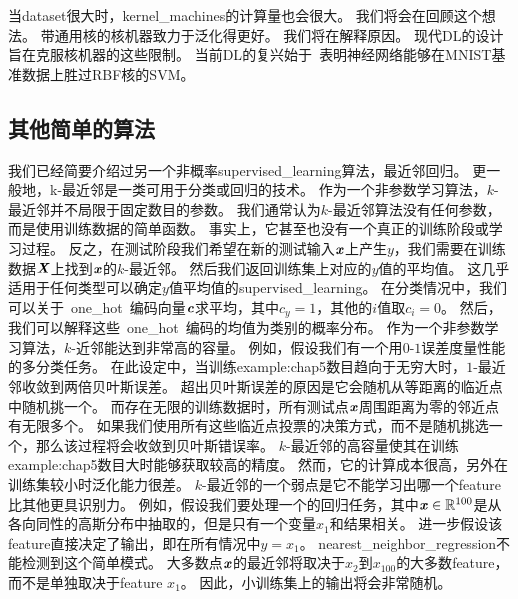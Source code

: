 当\gls{dataset}很大时，\gls{kernel_machines}的计算量也会很大。
我们将会在回顾这个想法。
带通用核的核机器致力于泛化得更好。
我们将在解释原因。
现代\gls{DL}的设计旨在克服核机器的这些限制。
当前\gls{DL}的复兴始于~\cite{Hinton06-small}表明神经网络能够在MNIST基准数据上胜过RBF核的\gls{SVM}。


\subsection{其他简单的算法}
\label{sec:other_simple_supervised_learning_algorithms}
我们已经简要介绍过另一个非概率\gls{supervised_learning}算法，最近邻回归。
更一般地，k-最近邻是一类可用于分类或回归的技术。
作为一个非参数学习算法，$k$-最近邻并不局限于固定数目的参数。
我们通常认为$k$-最近邻算法没有任何参数，而是使用训练数据的简单函数。
事实上，它甚至也没有一个真正的训练阶段或学习过程。
反之，在测试阶段我们希望在新的测试输入$\boldsymbol{\mathit{x}}$上产生$y$，我们需要在训练数据$\boldsymbol{\mathit{X}}$上找到$\boldsymbol{\mathit{x}}$的$k$-最近邻。
然后我们返回训练集上对应的$y$值的平均值。
这几乎适用于任何类型可以确定$y$值平均值的\gls{supervised_learning}。
在分类情况中，我们可以关于~\gls{one_hot}~编码向量$\boldsymbol{\mathit{c}}$求平均，其中$c_y = 1$，其他的$i$值取$c_i=0$。
然后，我们可以解释这些~\gls{one_hot}~编码的均值为类别的概率分布。
作为一个非参数学习算法，$k$-近邻能达到非常高的容量。
例如，假设我们有一个用$0$-$1$误差度量性能的多分类任务。
在此设定中，当训练\gls{example:chap5}数目趋向于无穷大时，$1$-最近邻收敛到两倍贝叶斯误差。
超出贝叶斯误差的原因是它会随机从等距离的临近点中随机挑一个。
而存在无限的训练数据时，所有测试点$\boldsymbol{\mathit{x}}$周围距离为零的邻近点有无限多个。
如果我们使用所有这些临近点投票的决策方式，而不是随机挑选一个，那么该过程将会收敛到贝叶斯错误率。
$k$-最近邻的高容量使其在训练\gls{example:chap5}数目大时能够获取较高的精度。
然而，它的计算成本很高，另外在训练集较小时泛化能力很差。
$k$-最近邻的一个弱点是它不能学习出哪一个\gls{feature}比其他更具识别力。
例如，假设我们要处理一个的回归任务，其中$\boldsymbol{\mathit{x}}\in\mathbb{R}^{100}$是从各向同性的高斯分布中抽取的，但是只有一个变量$x_1$和结果相关。
进一步假设该\gls{feature}直接决定了输出，即在所有情况中$y=x_1$。
\gls{nearest_neighbor_regression}不能检测到这个简单模式。
大多数点$\boldsymbol{\mathit{x}}$的最近邻将取决于$x_2$到$x_{100}$的大多数\gls{feature}，
而不是单独取决于\gls{feature} $x_1$。
因此，小训练集上的输出将会非常随机。


